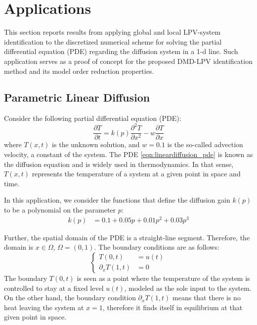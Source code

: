 \section{Applications} \label{sec:application}



This section reports results from applying global and local LPV-system identification to the discretized numerical scheme for solving the partial differential equation (PDE) regarding the diffusion system in a 1-d line.
%
Such application serves as a proof of concept for the proposed DMD-LPV identification method and its model order reduction properties.

\subsection{Parametric Linear Diffusion}


Consider the following partial differential equation (PDE):
\begin{equation} \label{eqn:lineardiffusion_pde}
  \frac{\partial T}{\partial t} = k(p) \frac{\partial^2 T}{\partial x^2} - w\frac{\partial T}{\partial x} 
\end{equation}
where $T(x,t)$ is the unknown solution, and $w=0.1$ is the so-called advection velocity, a constant of the system.
%
The PDE \eqref{eqn:lineardiffusion_pde} is known as the diffusion equation and is widely used in thermodynamics.
%
In that sense, $T(x,t)$ represents the temperature of a system at a given point in space and time.
%

In this application, we consider the functions that define the diffusion gain $k(p)$ to be a polynomial on the parameter $p$:
\begin{align}
    k(p) &= 0.1 + 0.05p + 0.01p^2 + 0.03p^3
\end{align}

Further, the spatial domain of the PDE is a straight-line segment. 
  Therefore, the domain is $x \in \Omega$, $\Omega = (0,1)$.
%
The boundary conditions are as follows:
\begin{equation}
\left \{ \begin{aligned}
    T(0,t) &= u(t)\\
    \partial_x T(1,t) &= 0
\end{aligned}
   \right .
\end{equation}
The boundary $T(0,t)$ is seen as a point where the temperature of the system is controlled to stay at a fixed level $u(t)$, modeled as the sole input to the system.
%
  On the other hand, the boundary condition $\partial_x T(1,t)$ means that there is no heat leaving the system  at $x = 1$, therefore it finds itself in equilibrium at that given point in space.



